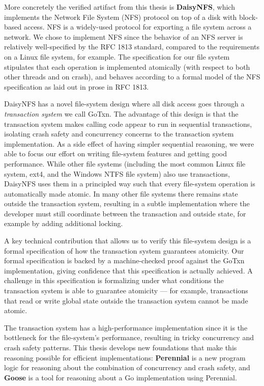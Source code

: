 More concretely the verified
artifact from this thesis is \textbf{DaisyNFS}, which implements the Network
File System (NFS) protocol on top of a disk with block-based access. NFS is a
widely-used protocol for exporting a file system across a network. We chose to
implement NFS since the behavior of an NFS server is relatively well-specified
by the RFC 1813 standard, compared to the requirements on a Linux file system,
for example. The specification for our file system stipulates that each
operation is implemented atomically (with respect to both other threads and on
crash), and behaves according to a formal model of the NFS specification as laid
out in prose in RFC 1813.

DaisyNFS has a novel file-system design where all disk access goes through a
\emph{transaction system} we call GoTxn. The advantage of this design is that the
transaction system makes calling code appear to run in sequential transactions,
isolating crash safety and concurrency concerns to the transaction system
implementation. As a side effect of having simpler sequential reasoning, we were
able to focus our effort on writing file-system features and getting good
performance. While other file systems (including the most common Linux file
system, ext4, and the Windows NTFS file system) also use transactions, DaisyNFS
uses them in a principled way such that every file-system operation is
automatically made atomic. In many other file systems there remains state
outside the transaction system, resulting in a subtle implementation where the
developer must still coordinate between the transaction and outside state, for
example by adding additional locking.

A key technical contribution that allows us to verify this file-system design is
a formal specification of how the transaction system guarantees atomicity. Our
formal specification is backed by a machine-checked proof against the GoTxn
implementation, giving confidence that this specification is actually achieved.
A challenge in this specification is formalizing under what conditions the
transaction system is able to guarantee atomicity --- for example, transactions
that read or write global state outside the transaction system cannot be made atomic.

The transaction system has a high-performance implementation since it is the
bottleneck for the file-system's performance, resulting in tricky concurrency
and crash safety patterns. This thesis develops new foundations that make this
reasoning possible for efficient implementations: \textbf{Perennial} is a new program logic for
reasoning about the combination of concurrency and crash safety, and
\textbf{Goose} is a tool for reasoning about a Go implementation using Perennial.

